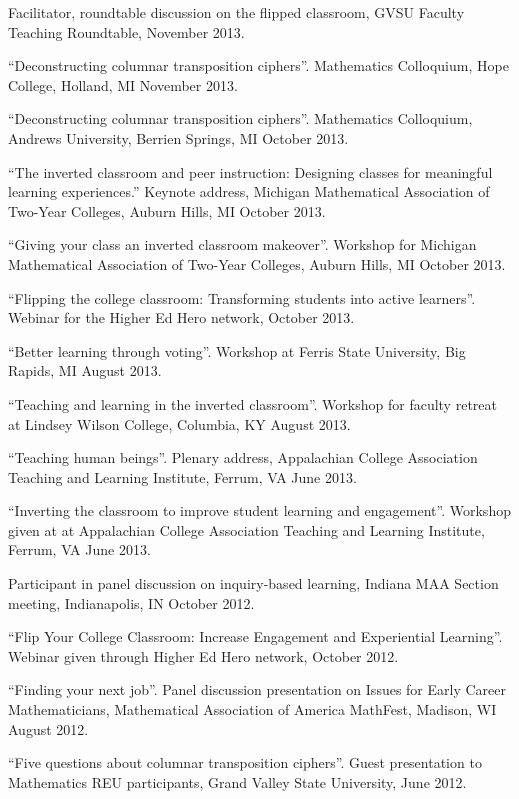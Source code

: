 \documentclass[letterpaper]{article}
\renewenvironment{itemize}{
  \begin{list}{}{
    \setlength{\leftmargin}{1.5em}
	\setlength{\itemsep}{0in}
  }
}{
  \end{list}
}
\begin{document}
\begin{itemize}
	\item Facilitator, roundtable discussion on the flipped classroom, GVSU Faculty Teaching Roundtable, November 2013. 
	\item ``Deconstructing columnar transposition ciphers''. Mathematics Colloquium, Hope College, Holland, MI November 2013. 
	\item ``Deconstructing columnar transposition ciphers''. Mathematics Colloquium, Andrews University, Berrien Springs, MI October 2013.
	\item ``The inverted classroom and peer instruction: Designing classes for meaningful learning experiences.'' Keynote address, Michigan Mathematical Association of Two-Year Colleges, Auburn Hills, MI October 2013. 
	\item ``Giving your class an inverted classroom makeover''. Workshop for Michigan Mathematical Association of Two-Year Colleges, Auburn Hills, MI October 2013. 
	\item ``Flipping the college classroom: Transforming students into active learners''. Webinar for the Higher Ed Hero network, October 2013. 
	\item ``Better learning through voting''. Workshop at Ferris State University, Big Rapids, MI August 2013.
	\item ``Teaching and learning in the inverted classroom''. Workshop for faculty retreat at Lindsey Wilson College, Columbia, KY August 2013. 
	\item ``Teaching human beings''. Plenary address, Appalachian College Association Teaching and Learning Institute, Ferrum, VA June 2013. 
	\item ``Inverting the classroom to improve student learning and engagement''. Workshop given at at Appalachian College Association Teaching and Learning Institute, Ferrum, VA June 2013. 
	\item Participant in panel discussion on inquiry-based learning, Indiana MAA Section meeting, Indianapolis, IN October 2012. 
	\item ``Flip Your College Classroom: Increase Engagement and Experiential Learning''. Webinar given through Higher Ed Hero network, October 2012.
	\item ``Finding your next job''. Panel discussion presentation on Issues for Early Career Mathematicians, Mathematical Association of America MathFest, Madison, WI August 2012.
	\item ``Five questions about columnar transposition ciphers''. Guest presentation to Mathematics REU participants, Grand Valley State University, June 2012. 

\end{itemize}
\end{document}
